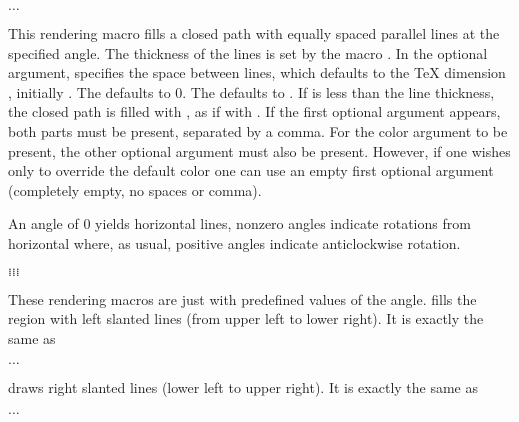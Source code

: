 \documentclass[letterpaper]{article}
\begin{document}
\begin{cd}
$\ldots$%
\end{cd}

This rendering macro fills a closed path with equally spaced parallel
lines at the specified angle. The thickness of the lines is set by the
macro . In the optional argument,  specifies
the space between lines, which defaults to the \TeX{} dimension
, initially \dim{3pt}. The  defaults to 0.
The  defaults to . If  is
less than the line thickness, the closed path is filled with
, as if with . If the first optional argument
appears, both parts must be present, separated by a comma. For the color
argument to be present, the other optional argument must also be
present. However, if one wishes only to override the default color one
can use an empty first optional argument (completely empty, no spaces or
comma).

An angle of $0$ yields horizontal lines, nonzero angles indicate
rotations from horizontal where, as usual, positive angles indicate
anticlockwise rotation.

\begin{cd}
$\ldots$\\
$\ldots$\\
$\ldots$\\
$\ldots$%
%
%
%
%
\end{cd}

These rendering macros are just  with predefined values of
the angle.  fills the region with left slanted lines (from
upper left to lower right). It is exactly the same as
\begin{display}
  $\ldots$
\end{display}

 draws right slanted lines (lower left to upper right). It is
exactly the same as
\begin{display}
  $\ldots$
\end{display}
\end{document}

